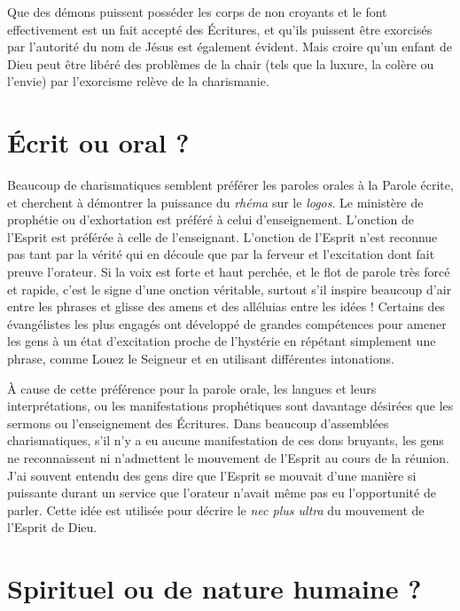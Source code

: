 Que des démons puissent posséder les corps de non croyants
 et le font effectivement est un fait accepté des Écritures,
 et qu'ils puissent être exorcisés par l'autorité du nom de Jésus
 est également évident. Mais croire qu'un enfant de Dieu peut être libéré
 des problèmes de la chair (tels que la luxure, la colère ou l'envie)
 par l'exorcisme relève de la charismanie.


\section{\'Ecrit ou oral ?}

Beaucoup de charismatiques semblent préférer les paroles orales
 à la Parole écrite, et cherchent à démontrer la puissance
 du \emph{rhéma} sur le \emph{logos}.
 Le ministère de prophétie ou d'exhortation
 est préféré à celui d'enseignement. L'onction de l'Esprit est préférée
 à celle de l'enseignant. L'onction de l'Esprit n'est reconnue
 pas tant par la vérité qui en découle que par la ferveur
 et l'excitation dont fait preuve l'orateur. Si la voix est forte
 et haut perchée, et le flot de parole très forcé et rapide,
 c'est le signe d'une onction véritable, surtout s'il inspire beaucoup
 d'air entre les phrases et glisse des amens et des alléluias
 entre les idées ! Certains des évangélistes les plus engagés
 ont développé de grandes compétences pour amener les gens
 à un état d'excitation proche de l'hystérie en répétant simplement
 une phrase, comme\frcolon{} \Og Louez le Seigneur \Fg{} et en utilisant différentes
 intonations.

À cause de cette préférence pour la parole orale, les langues
 et leurs interprétations, ou les manifestations prophétiques
 sont davantage désirées que les sermons ou l'enseignement des Écritures.
 Dans beaucoup d'assemblées charismatiques, s'il n'y a eu aucune
 manifestation de ces dons bruyants, les gens ne reconnaissent ni
 n'admettent le mouvement de l'Esprit au cours de la réunion.
 J'ai souvent entendu des gens dire que l'Esprit se mouvait d'une manière
 si puissante durant un service que l'orateur n'avait même pas eu
 l'opportunité de parler. Cette idée est utilisée pour décrire le
 \emph{nec plus ultra} du mouvement de l'Esprit de Dieu.


\section{Spirituel ou de nature humaine ?}

